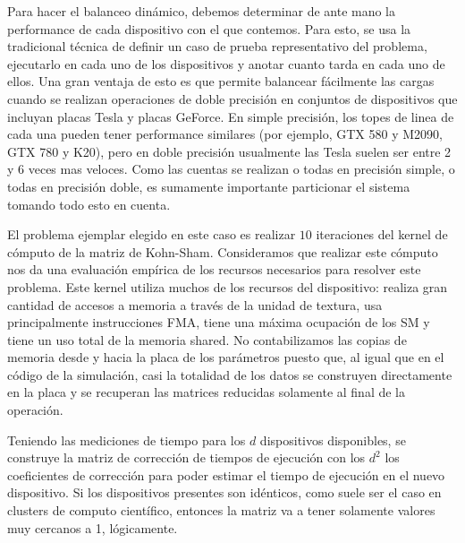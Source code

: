 Para hacer el balanceo din\'amico, debemos determinar de ante mano la performance de cada
dispositivo con el que contemos. Para esto, se usa la tradicional t\'ecnica de definir un
caso de prueba representativo del problema, ejecutarlo en cada uno de los dispositivos y anotar
cuanto tarda en cada uno de ellos. Una gran ventaja de esto es que permite balancear f\'acilmente las
cargas cuando se realizan operaciones de doble precisi\'on en conjuntos de dispositivos que incluyan
placas Tesla y placas GeForce. En simple precisi\'on, los topes de linea de cada una pueden tener
performance similares (por ejemplo, GTX 580 y M2090, GTX 780 y K20), pero en doble precisi\'on
usualmente las Tesla suelen ser entre 2 y 6 veces mas veloces. Como las cuentas se realizan
o todas en precisi\'on simple, o todas en precisi\'on doble, es sumamente importante particionar el
sistema tomando todo esto en cuenta.

El problema ejemplar elegido en este caso es realizar $10$ iteraciones del kernel de c\'omputo de la matriz de Kohn-Sham.
Consideramos que realizar este c\'omputo nos da una evaluaci\'on
emp\'irica de los recursos necesarios para resolver este problema. Este kernel utiliza muchos
de los recursos del dispositivo: realiza gran cantidad de accesos a memoria a trav\'es
de la unidad de textura, usa principalmente instrucciones FMA, tiene una m\'axima ocupaci\'on de los SM
y tiene un uso total de la memoria shared. No contabilizamos las copias de memoria desde y hacia la
placa de los par\'ametros puesto que, al igual que en el c\'odigo de la simulaci\'on, casi la totalidad
de los datos se construyen directamente en la placa y se recuperan las matrices reducidas solamente al final
de la operaci\'on.

Teniendo las mediciones de tiempo para los $d$ dispositivos disponibles, se construye la matriz de
correcci\'on de tiempos de ejecuci\'on con los $d^2$ los coeficientes de correcci\'on para poder estimar el tiempo de
ejecuci\'on en el nuevo dispositivo. Si los dispositivos presentes son id\'enticos, como suele ser el caso
en clusters de computo cient\'ifico, entonces
la matriz va a tener solamente valores muy cercanos a 1, l\'ogicamente.

